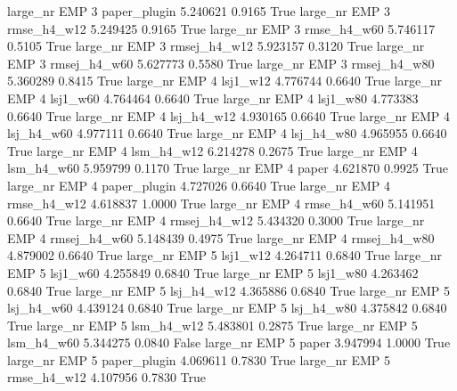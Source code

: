   large_nr      EMP                 3 paper_plugin    5.240621      0.9165    True
  large_nr      EMP                 3  rmse_h4_w12    5.249425      0.9165    True
  large_nr      EMP                 3  rmse_h4_w60    5.746117      0.5105    True
  large_nr      EMP                 3 rmsej_h4_w12    5.923157      0.3120    True
  large_nr      EMP                 3 rmsej_h4_w60    5.627773      0.5580    True
  large_nr      EMP                 3 rmsej_h4_w80    5.360289      0.8415    True
  large_nr      EMP                 4     lsj1_w12    4.776744      0.6640    True
  large_nr      EMP                 4     lsj1_w60    4.764464      0.6640    True
  large_nr      EMP                 4     lsj1_w80    4.773383      0.6640    True
  large_nr      EMP                 4   lsj_h4_w12    4.930165      0.6640    True
  large_nr      EMP                 4   lsj_h4_w60    4.977111      0.6640    True
  large_nr      EMP                 4   lsj_h4_w80    4.965955      0.6640    True
  large_nr      EMP                 4   lsm_h4_w12    6.214278      0.2675    True
  large_nr      EMP                 4   lsm_h4_w60    5.959799      0.1170    True
  large_nr      EMP                 4        paper    4.621870      0.9925    True
  large_nr      EMP                 4 paper_plugin    4.727026      0.6640    True
  large_nr      EMP                 4  rmse_h4_w12    4.618837      1.0000    True
  large_nr      EMP                 4  rmse_h4_w60    5.141951      0.6640    True
  large_nr      EMP                 4 rmsej_h4_w12    5.434320      0.3000    True
  large_nr      EMP                 4 rmsej_h4_w60    5.148439      0.4975    True
  large_nr      EMP                 4 rmsej_h4_w80    4.879002      0.6640    True
  large_nr      EMP                 5     lsj1_w12    4.264711      0.6840    True
  large_nr      EMP                 5     lsj1_w60    4.255849      0.6840    True
  large_nr      EMP                 5     lsj1_w80    4.263462      0.6840    True
  large_nr      EMP                 5   lsj_h4_w12    4.365886      0.6840    True
  large_nr      EMP                 5   lsj_h4_w60    4.439124      0.6840    True
  large_nr      EMP                 5   lsj_h4_w80    4.375842      0.6840    True
  large_nr      EMP                 5   lsm_h4_w12    5.483801      0.2875    True
  large_nr      EMP                 5   lsm_h4_w60    5.344275      0.0840   False
  large_nr      EMP                 5        paper    3.947994      1.0000    True
  large_nr      EMP                 5 paper_plugin    4.069611      0.7830    True
  large_nr      EMP                 5  rmse_h4_w12    4.107956      0.7830    True
